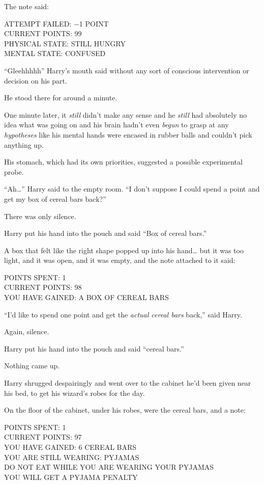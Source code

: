 The note said:

ATTEMPT FAILED: −1 POINT\\CURRENT POINTS: 99\\PHYSICAL STATE: STILL
HUNGRY\\MENTAL STATE: CONFUSED

``Gleehhhhh'' Harry's mouth said without any sort of conscious
intervention or decision on his part.

He stood there for around a minute.

One minute later, it \emph{still} didn't make any sense and he
\emph{still} had absolutely no idea what was going on and his brain
hadn't even \emph{begun} to grasp at any \emph{hypotheses} like his
mental hands were encased in rubber balls and couldn't pick anything up.

His stomach, which had its own priorities, suggested a possible
experimental probe.

``Ah\ldots{}'' Harry said to the empty room. ``I don't suppose I could
spend a point and get my box of cereal bars back?''

There was only silence.

Harry put his hand into the pouch and said ``Box of cereal bars.''

A box that felt like the right shape popped up into his hand\ldots{} but
it was too light, and it was open, and it was empty, and the note
attached to it said:

POINTS SPENT: 1\\CURRENT POINTS: 98\\YOU HAVE GAINED: A BOX OF CEREAL
BARS

``I'd like to spend one point and get the \emph{actual cereal bars}
back,'' said Harry.

Again, silence.

Harry put his hand into the pouch and said ``cereal bars.''

Nothing came up.

Harry shrugged despairingly and went over to the cabinet he'd been given
near his bed, to get his wizard's robes for the day.

On the floor of the cabinet, under his robes, were the cereal bars, and
a note:

POINTS SPENT: 1\\CURRENT POINTS: 97\\YOU HAVE GAINED: 6 CEREAL BARS\\YOU
ARE STILL WEARING: PYJAMAS\\DO NOT EAT WHILE YOU ARE WEARING YOUR
PYJAMAS\\YOU WILL GET A PYJAMA PENALTY

